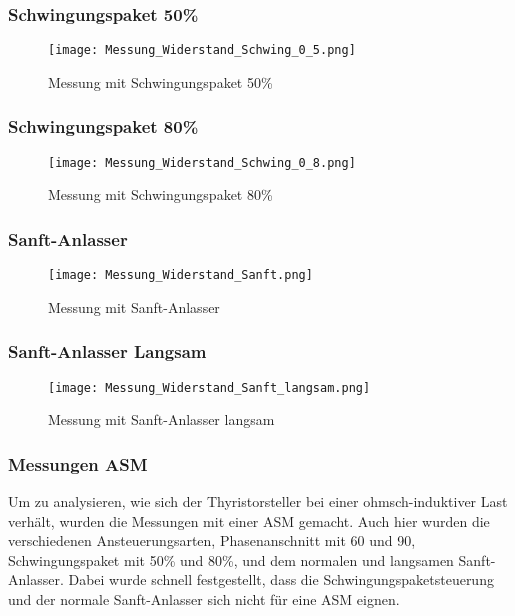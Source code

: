 \newpage
\subsubsection*{Schwingungspaket 50\%}
\begin{figure}[ht!]
	\centering
	\texttt{[image: Messung\_Widerstand\_Schwing\_0\_5.png]}	
	\caption{Messung mit Schwingungspaket 50\%}\label{fig:Mess_Schwing_50}
\end{figure}

\newpage
\subsubsection*{Schwingungspaket 80\%}
\begin{figure}[ht!]
	\centering
	\texttt{[image: Messung\_Widerstand\_Schwing\_0\_8.png]}	
	\caption{Messung mit Schwingungspaket 80\%}\label{fig:Mess_Schwing_80}
\end{figure}

\newpage
\subsubsection*{Sanft-Anlasser}
\begin{figure}[ht!]
	\centering
	\texttt{[image: Messung\_Widerstand\_Sanft.png]}	
	\caption{Messung mit Sanft-Anlasser}\label{fig:Mess_Sanft}
\end{figure}

\newpage
\subsubsection*{Sanft-Anlasser Langsam}
\begin{figure}[ht!]
	\centering
	\texttt{[image: Messung\_Widerstand\_Sanft\_langsam.png]}	
	\caption{Messung mit Sanft-Anlasser langsam}\label{fig:Mess_Sanft_langsam}
\end{figure}

\newpage
\subsubsection{Messungen ASM}
Um zu analysieren, wie sich der Thyristorsteller bei einer ohmsch-induktiver Last verhält, wurden die Messungen mit einer ASM gemacht. Auch hier wurden die verschiedenen Ansteuerungsarten, Phasenanschnitt mit 60\textdegree \hspace{0.02cm} und 90\textdegree \hspace{0.02cm}, Schwingungspaket mit 50\% und 80\%, und dem normalen und langsamen Sanft-Anlasser. Dabei wurde schnell festgestellt, dass die Schwingungspaketsteuerung und der normale Sanft-Anlasser sich nicht für eine ASM eignen. 


